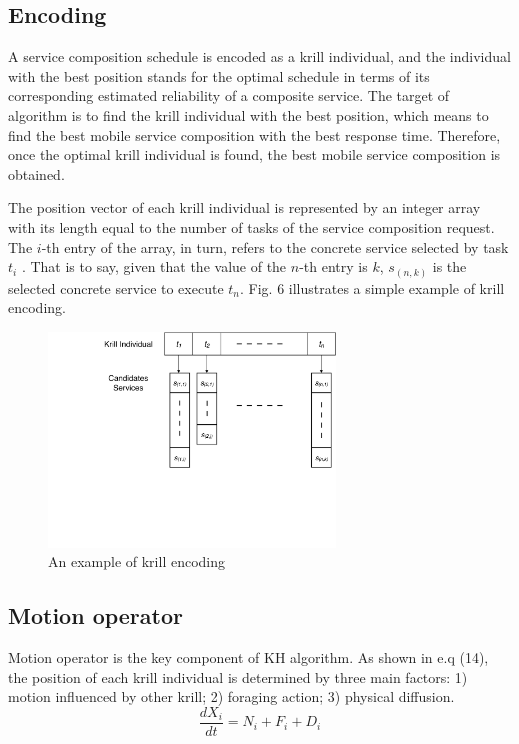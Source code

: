 \documentclass[journal]{IEEEtran}
\begin{document}
\subsection{Encoding}
A service composition schedule is encoded as a krill individual, and the individual with the best position stands for the optimal schedule in terms of its corresponding estimated reliability of a composite service. The target of algorithm is to find the krill individual with the best position, which means to find the best mobile service composition with the best response time. Therefore, once the optimal krill individual is found, the best mobile service composition is obtained.

The position vector of each krill individual is represented by an integer array with its length equal to the number of tasks of the service composition request. The $i$-th entry of the array, in turn, refers to the concrete service selected by task $t_i$ . That is to say, given that the value of the $n$-th entry is $k$, $s_{(n,k)}$ is the selected concrete service to execute $t_n$. Fig. 6 illustrates a simple example of  krill encoding.

\begin{figure}[!t]
\centering
\includegraphics[width=3in]{./img/pic4.pdf}
\caption{An example of krill encoding}
\label{Krill encoding}
\end{figure}


\subsection{Motion operator}
% 
% 

Motion operator is the key component of KH algorithm. As shown in e.q (14), the position of each krill individual is determined by three main factors: 1) motion influenced by other krill; 2) foraging action; 3) physical diffusion. 
\begin{equation}
\frac{dX_i}{dt} =N_i+F_i+D_i
\end{equation}
\end{document}
